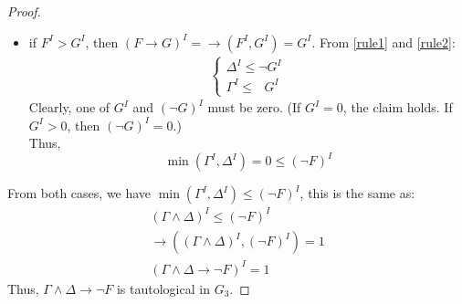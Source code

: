 \begin{proof}
\begin{itemize}
\item if $F^I > G^I$, then $(F \rightarrow G)^I = \rightarrow (F^I, G^I) = G^I$. From \eqref{rule1} and  \eqref{rule2}:
\begin{gather*}
 \left\{
        \begin{array}{c}      
        \Delta^I \leq \neg G^I \\
        \Gamma^I \leq \:\:\:G^I
        \end{array}\right.
\end{gather*}
Clearly, one of $G^I$ and $(\neg G)^I$ must be zero. (If $G^I = 0$, the claim holds. If $G^I > 0$, then $(\neg G)^I = 0$.) \\
Thus, 
\begin{equation*}
\min(\Gamma^I, \Delta^I) = 0 \leq (\neg F)^I 
\end{equation*}
\end{itemize}
From both cases, we have $\min(\Gamma^I, \Delta^I) \leq (\neg F)^I$, this is the same as:
\begin{eqnarray*}
(\Gamma \wedge \Delta)^I \leq (\neg F)^I \\
\rightarrow ((\Gamma \wedge \Delta)^I, (\neg F)^I) = 1\\
(\Gamma \wedge \Delta \rightarrow \neg F)^I = 1
\end{eqnarray*}
Thus, $\Gamma \wedge \Delta \rightarrow \neg F$ is tautological in $G_3$. 
\end{proof}

